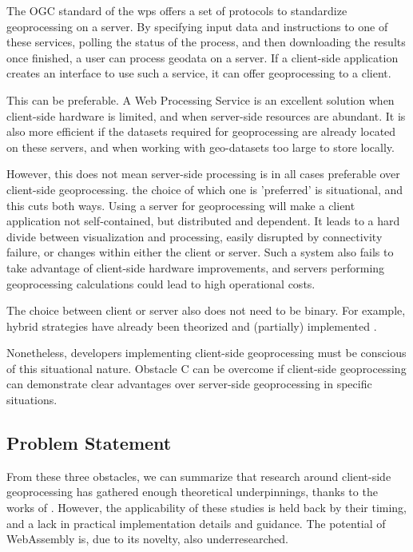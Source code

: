 The OGC standard of the \ac{wps} offers a set of protocols to standardize geoprocessing on a server. By specifying input data and instructions to one of these services, polling the status of the process, and then downloading the results once finished, a user can process geodata on a server. If a client-side application creates an interface to use such a service, it can offer geoprocessing to a client.

This can be preferable. A Web Processing Service is an excellent solution when client-side hardware is limited, and when server-side resources are abundant. It is also more efficient if the datasets required for geoprocessing are already located on these servers, and when working with geo-datasets too large to store locally. 

However, this does not mean server-side processing is in all cases preferable over client-side geoprocessing. the choice of which one is 'preferred' is situational, and this cuts both ways. Using a server for geoprocessing will make a client application not self-contained, but distributed and dependent. It leads to a hard divide between visualization and processing, easily disrupted by connectivity failure, or changes within either the client or server. Such a system also fails to take advantage of client-side hardware improvements, and servers performing geoprocessing calculations could lead to high operational costs.

The choice between client or server also does not need to be binary. For example, hybrid strategies have already been theorized and (partially) implemented \cite{panidi_hybrid_2015}.

Nonetheless, developers implementing client-side geoprocessing must be conscious of this situational nature.
Obstacle C can be overcome if client-side geoprocessing can demonstrate clear advantages over server-side geoprocessing in specific situations. 

\newpage
\subsection{Problem Statement}

From these three obstacles, we can summarize that research around client-side geoprocessing has gathered enough theoretical underpinnings, thanks to the works of \cite{kulawiak_analysis_2019, panidi_hybrid_2015, hamilton_client-side_2014}. However, the applicability of these studies is held back by their timing, and a lack in practical implementation details and guidance. The potential of WebAssembly is, due to its novelty, also underresearched.


